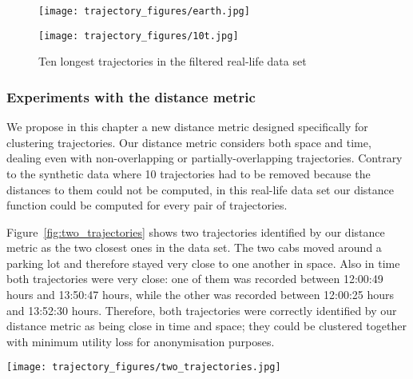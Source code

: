 \begin{figure}[!ht]
\begin{minipage}[b]{0.5\linewidth}
\centering
\texttt{[image: trajectory\_figures/earth.jpg]}
\caption{Example of an outlier trajectory in the original real-life data set}
\label{fig:outlier}
\end{minipage}
\hspace{0.5cm}
\begin{minipage}[b]{0.5\linewidth}
\centering
\texttt{[image: trajectory\_figures/10t.jpg]}
\caption{Ten longest trajectories in the filtered real-life data set}
\label{fig:ten_trajectories}
\end{minipage}
\end{figure}



\subsubsection{Experiments with the distance metric}

We propose in this chapter
a new distance metric designed specifically for clustering
trajectories. Our distance metric considers both space and time,
dealing even with non-overlapping or partially-overlapping trajectories.
Contrary to the synthetic data where 10
trajectories had to be removed because the distances
to them could not be computed,
in this real-life data set our distance function
could be computed for every pair of trajectories.

Figure~\ref{fig:two_trajectories} shows two trajectories identified by
our distance metric as the two closest ones in the data set.
The two cabs moved around a parking lot and therefore stayed very
close to one another in space. Also in time both trajectories were very close:
one of them was recorded between 12:00:49 hours and 13:50:47
hours, while the other was recorded between 12:00:25 hours and 13:52:30 hours.
Therefore, both trajectories were correctly identified
by our distance metric as being close in time and space; they
could be clustered together with minimum utility loss for anonymisation
purposes.

\begin{figure*}[p]
\centering
\texttt{[image: trajectory\_figures/two\_trajectories.jpg]}
\caption{The two closest trajectories in the real-life data set
according to our distance metric}
\label{fig:two_trajectories}
\end{figure*}

